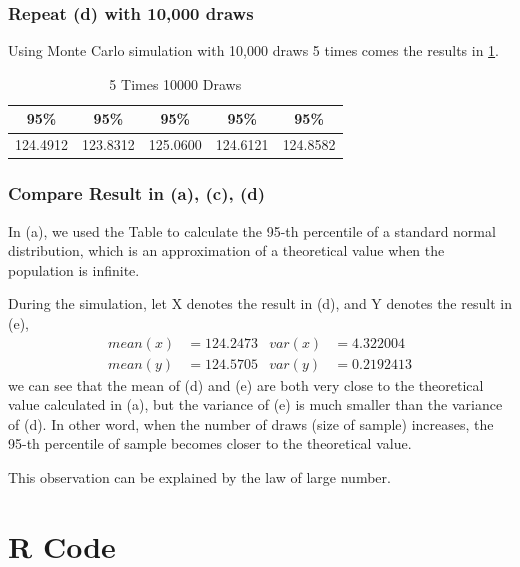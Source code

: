 \documentclass[12pt,letterpaper,titlepage,en-US]{article}
\begin{document}
\subsubsection{Repeat (d) with 10,000 draws}
Using Monte Carlo simulation with 10,000 draws 5 times comes the results in \cref{210000}.
\begin{table}[H]
\centering
\begin{tabular}{|c|c|c|c|c|}
\hline
     95\%      &95\%      &95\%      &95\%      &95\% \\\hline
124.4912 &123.8312 &125.0600 &124.6121 &124.8582 \\\hline
\end{tabular}
\caption{5 Times 10000 Draws}\label{210000}
\end{table}
\subsubsection{Compare Result in (a), (c), (d)}
In (a), we used the Table to calculate the 95-th percentile of a standard normal
distribution, which is an approximation of a theoretical value when the population
is infinite.

During the simulation, let X denotes the result in (d), and Y denotes the result in (e),
\begin{align*}
mean(x) &= 124.2473 & var(x) &=  4.322004 \\
mean(y) &= 124.5705 & var(y) &=  0.2192413
\end{align*}
we can see that the mean of (d) and (e) are both very close to the theoretical value
calculated in (a), but the variance of (e) is much smaller than the variance of (d).
In other word, when the number of draws (size of sample) increases, the
95-th percentile of sample becomes closer to the theoretical value.

This observation can be explained by the law of large number.

\section{R Code}


\end{document}
